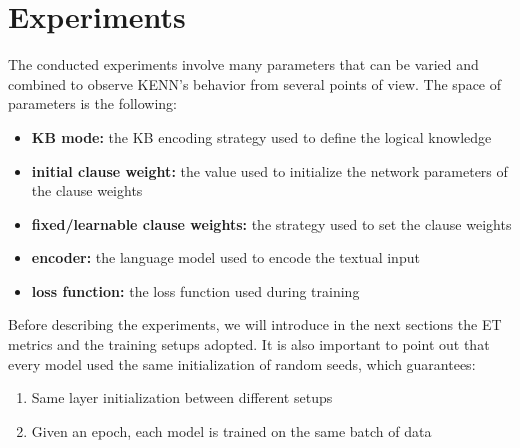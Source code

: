 \section{Experiments} \label{experiments}
The conducted experiments involve many parameters that can be varied and combined to observe KENN's behavior from several points of view. The space of parameters is the following:
\begin{itemize}
    \item \textbf{KB mode:} the KB encoding strategy used to define the logical knowledge
    \item \textbf{initial clause weight:} the value used to initialize the network parameters of the clause weights
    \item \textbf{fixed/learnable clause weights:} the strategy used to set the clause weights
    \item \textbf{encoder:} the language model used to encode the textual input
    \item \textbf{loss function:} the loss function used during training
\end{itemize}
Before describing the experiments, we will introduce in the next sections the ET metrics and the training setups adopted. It is also important to point out that every model used the same initialization of random seeds, which guarantees: 
\begin{enumerate}
    \item Same layer initialization between different setups
    \item Given an epoch, each model is trained on the same batch of data
\end{enumerate}










